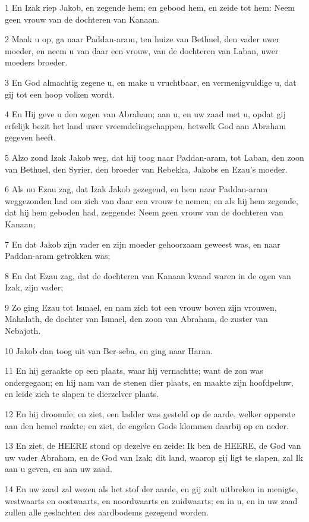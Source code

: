 \par 1 En Izak riep Jakob, en zegende hem; en gebood hem, en zeide tot hem: Neem geen vrouw van de dochteren van Kanaan.
\par 2 Maak u op, ga naar Paddan-aram, ten huize van Bethuel, den vader uwer moeder, en neem u van daar een vrouw, van de dochteren van Laban, uwer moeders broeder.
\par 3 En God almachtig zegene u, en make u vruchtbaar, en vermenigvuldige u, dat gij tot een hoop volken wordt.
\par 4 En Hij geve u den zegen van Abraham; aan u, en uw zaad met u, opdat gij erfelijk bezit het land uwer vreemdelingschappen, hetwelk God aan Abraham gegeven heeft.
\par 5 Alzo zond Izak Jakob weg, dat hij toog naar Paddan-aram, tot Laban, den zoon van Bethuel, den Syrier, den broeder van Rebekka, Jakobs en Ezau's moeder.
\par 6 Als nu Ezau zag, dat Izak Jakob gezegend, en hem naar Paddan-aram weggezonden had om zich van daar een vrouw te nemen; en als hij hem zegende, dat hij hem geboden had, zeggende: Neem geen vrouw van de dochteren van Kanaan;
\par 7 En dat Jakob zijn vader en zijn moeder gehoorzaam geweest was, en naar Paddan-aram getrokken was;
\par 8 En dat Ezau zag, dat de dochteren van Kanaan kwaad waren in de ogen van Izak, zijn vader;
\par 9 Zo ging Ezau tot Ismael, en nam zich tot een vrouw boven zijn vrouwen, Mahalath, de dochter van Ismael, den zoon van Abraham, de zuster van Nebajoth.
\par 10 Jakob dan toog uit van Ber-seba, en ging naar Haran.
\par 11 En hij geraakte op een plaats, waar hij vernachtte; want de zon was ondergegaan; en hij nam van de stenen dier plaats, en maakte zijn hoofdpeluw, en leide zich te slapen te dierzelver plaats.
\par 12 En hij droomde; en ziet, een ladder was gesteld op de aarde, welker opperste aan den hemel raakte; en ziet, de engelen Gods klommen daarbij op en neder.
\par 13 En ziet, de HEERE stond op dezelve en zeide: Ik ben de HEERE, de God van uw vader Abraham, en de God van Izak; dit land, waarop gij ligt te slapen, zal Ik aan u geven, en aan uw zaad.
\par 14 En uw zaad zal wezen als het stof der aarde, en gij zult uitbreken in menigte, westwaarts en oostwaarts, en noordwaarts en zuidwaarts; en in u, en in uw zaad zullen alle geslachten des aardbodems gezegend worden.
